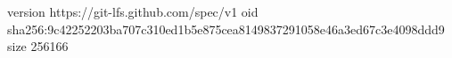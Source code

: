 version https://git-lfs.github.com/spec/v1
oid sha256:9c42252203ba707c310ed1b5e875cea8149837291058e46a3ed67c3e4098ddd9
size 256166
